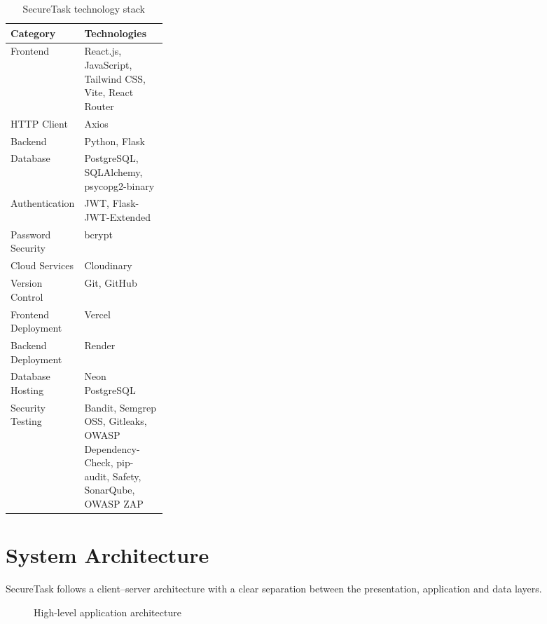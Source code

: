 \documentclass[11pt,a4paper]{article}
\newcommand{\tablehead}{\rowcolor{LightBlue}}
\begin{document}
\begin{table}[htbp]
\centering
\renewcommand{\arraystretch}{1.35}
\begin{tabularx}{\linewidth}{@{}L{0.26\linewidth}X@{}}
\toprule
\tablehead \textbf{Category} & \textbf{Technologies} \\
\midrule
Frontend & React.js, JavaScript, Tailwind CSS, Vite, React Router \\
HTTP Client & Axios \\
Backend & Python, Flask \\
Database & PostgreSQL, SQLAlchemy, psycopg2-binary \\
Authentication & JWT, Flask-JWT-Extended \\
Password Security & bcrypt \\
Cloud Services & Cloudinary \\
Version Control & Git, GitHub \\
Frontend Deployment & Vercel \\
Backend Deployment & Render \\
Database Hosting & Neon PostgreSQL \\
Security Testing & Bandit, Semgrep OSS, Gitleaks, OWASP Dependency-Check, pip-audit, Safety, SonarQube, OWASP ZAP \\
\bottomrule
\end{tabularx}
\caption{SecureTask technology stack}
\end{table}

\section{System Architecture}

SecureTask follows a client--server architecture with a clear separation between the presentation, application and data layers.

\begin{figure}[H]
\centering
{}
\caption{High-level application architecture}
\end{figure}
\end{document}
